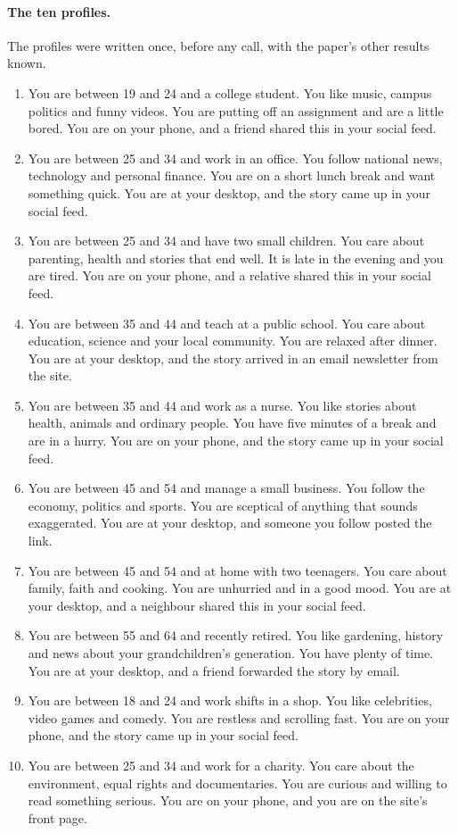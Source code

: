 \paragraph{The ten profiles.} The profiles were written once, before any call, with the paper's other results known.
\begin{enumerate}\small
\item You are between 19 and 24 and a college student. You like music, campus politics and funny videos. You are putting off an assignment and are a little bored. You are on your phone, and a friend shared this in your social feed.
\item You are between 25 and 34 and work in an office. You follow national news, technology and personal finance. You are on a short lunch break and want something quick. You are at your desktop, and the story came up in your social feed.
\item You are between 25 and 34 and have two small children. You care about parenting, health and stories that end well. It is late in the evening and you are tired. You are on your phone, and a relative shared this in your social feed.
\item You are between 35 and 44 and teach at a public school. You care about education, science and your local community. You are relaxed after dinner. You are at your desktop, and the story arrived in an email newsletter from the site.
\item You are between 35 and 44 and work as a nurse. You like stories about health, animals and ordinary people. You have five minutes of a break and are in a hurry. You are on your phone, and the story came up in your social feed.
\item You are between 45 and 54 and manage a small business. You follow the economy, politics and sports. You are sceptical of anything that sounds exaggerated. You are at your desktop, and someone you follow posted the link.
\item You are between 45 and 54 and at home with two teenagers. You care about family, faith and cooking. You are unhurried and in a good mood. You are at your desktop, and a neighbour shared this in your social feed.
\item You are between 55 and 64 and recently retired. You like gardening, history and news about your grandchildren's generation. You have plenty of time. You are at your desktop, and a friend forwarded the story by email.
\item You are between 18 and 24 and work shifts in a shop. You like celebrities, video games and comedy. You are restless and scrolling fast. You are on your phone, and the story came up in your social feed.
\item You are between 25 and 34 and work for a charity. You care about the environment, equal rights and documentaries. You are curious and willing to read something serious. You are on your phone, and you are on the site's front page.
\end{enumerate}

